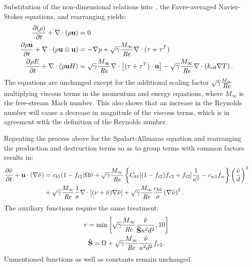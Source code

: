 Substitution of the non-dimensional relations into~, the Favre-averaged Navier-Stokes equations, and rearranging yields:
\begin{align}
      \frac{\partial (\rho )}{\partial t}  + \nabla \cdot (\rho  \mathbf{u})  &= 0 \\
     \frac{\partial \rho\mathbf{u}}{\partial t} 
    + \nabla\cdot(\rho\mathbf{u}\otimes\mathbf{u})
    &= -\nabla p + \sqrt{\gamma}\frac{M_\infty}{\mbox{\textit{Re}}}\nabla\cdot(\tau + \tau^T)
    \\
     \frac{\partial \rho E}{\partial t}  + \nabla\cdot (\rho \mathbf{u} H) &=
        \sqrt{\gamma}\frac{M_\infty}{\mbox{\textit{Re}}}\nabla\cdot \left[
            (\tau + \tau^T) \cdot \mathbf{u}
        \right]
        - \sqrt{\gamma}\frac{M_\infty}{\mbox{\textit{Re}}}\nabla\cdot\left(k_{\text{eff}}\nabla T\right) .
\end{align}
The equations are unchanged except for the additional scaling factor $\sqrt{\gamma}\frac{M_\infty}{\mbox{\textit{Re}}}$ multiplying viscous terms in the momentum and energy equations, where $M_\infty$ is the free-stream Mach number. This also shows that an increase in the Reynolds number will cause a decrease in magnitude of the viscous terms, which is in agreement with the definition of the Reynolds number.

Repeating the process above for the Spalart-Allmaras equation and rearranging the production and destruction terms so as to group terms with common factors results in:
\begin{align}
\begin{split}
    \pdiff{\sa}{t} + \vec{u}\cdot(\nabla\sa) &=
        c_{b1}(1 - f_{t2})\Omega\sa
        + \ndim \left\{
            C_{b1}[(1 - f_{t2})f_{v2} + f_{t2}]\frac{1}{\kappa^2} - c_{w1}f_w
        \right\} \left(\frac{\sa}{d}\right)^2
        \\
        &+ \ndim \frac{1}{\sigma}\nabla\cdot\left[ (\nu + \sa) \nabla\sa \right]
        + \ndim \frac{c_{b2}}{\sigma}\left(\nabla \sa\right)^2.
\end{split}
\label{eq:synsa}
\end{align}
The auxiliary functions require the same treatment:
\begin{gather*}
    r = \text{min} \left[
        \ndim \frac{\sa}{\hat{S}\kappa^2 d^2}, 10
    \right] \\
    \hat{S} = \Omega + \ndim \frac{\sa}{\kappa^2 d^2} f_{v2}.
\end{gather*}
Unmentioned functions as well as constants remain unchanged.
\label{sec:synnondim}
%
